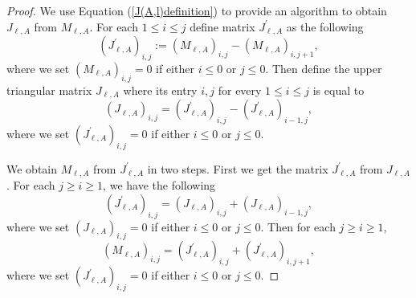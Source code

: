 \documentclass[12pt]{amsart}
\numberwithin{equation}{section}
\theoremstyle{plain} \newtheorem{theorem}{Theorem}[section]
\theoremstyle{definition} \newtheorem{definition}[theorem]{Definition}
\begin{document}
\begin{proof}

We use Equation (\ref{J(A,l)definition}) to provide an algorithm to obtain $J_{\ell,A}$ from $M_{\ell,A}$. For each $1\leq i\leq j$ define matrix $J^\prime_{\ell,A}$ as the following 
\begin{equation}\label{J'matrixdef}
(J^\prime_{\ell,A})_{i,j} := (M_{\ell,A})_{i,j}-(M_{\ell,A})_{i,j+1},
\end{equation}
where we set $(M_{\ell,A})_{i,j}=0$ if either $i\leq 0$ or $j\leq 0$.
Then define the upper triangular matrix $J_{\ell,A}$ where its entry $i,j$ for every $1\leq i\leq j$ is equal to 
\begin{equation}\label{JfromJ'def}
(J_{\ell,A})_{i,j} = (J^\prime_{\ell,A})_{i,j}-(J^\prime_{\ell,A})_{i-1,j},
\end{equation}
where we set $(J^\prime_{\ell,A})_{i,j}=0$  if either $i\leq 0$ or $j\leq 0$.

We obtain  $M_{\ell,A}$ from $J^\prime_{\ell,A}$ in two steps.
First we get the matrix $J^\prime_{\ell,A}$ from $J_{\ell,A}$. For each $j\geq i\geq 1$,  we have the following
\begin{equation}
(J^\prime_{\ell,A})_{i,j} = (J_{\ell,A})_{i,j}+(J_{\ell,A})_{i-1,j},
\end{equation}
where we set $(J_{\ell,A})_{i,j}=0$ if either $i\leq 0$ or $j\leq 0$.
Then for each $j\geq i\geq 1$, 
\begin{equation}
(M_{\ell,A})_{i,j}=(J^\prime_{\ell,A})_{i,j}+(J^\prime_{\ell,A})_{i,j+1},
\end{equation}
where we set $(J^\prime_{\ell,A})_{i,j}=0$ if either $i\leq 0$ or $j\leq 0$.
\end{proof}
\end{document}
